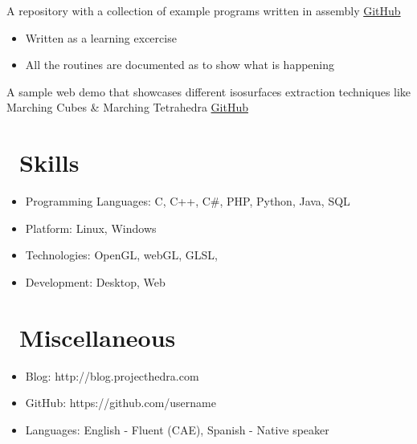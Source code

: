 \documentclass{resume}
\begin{document}
A repository with a collection of example programs written in assembly
\href {https://github.com/maxilevi/asm-examples}{GitHub}
\begin{itemize}
  \item Written as a learning excercise
  \item All the routines are documented as to show what is happening
\end{itemize}

A sample web demo that showcases different isosurfaces extraction techniques like Marching Cubes \& Marching Tetrahedra
\href {https://github.com/maxilevi/isosurface}{GitHub}


\section{\faCogs\ Skills}
\begin{itemize}[parsep=0.5ex]
  \item Programming Languages: C, C++, C\#, PHP, Python, Java, SQL
  \item Platform: Linux, Windows
  \item Technologies: OpenGL, webGL, GLSL,
  \item Development: Desktop, Web
\end{itemize}


\section{\faInfo\ Miscellaneous}
\begin{itemize}[parsep=0.5ex]
  \item Blog: http://blog.projecthedra.com
  \item GitHub: https://github.com/username
  \item Languages: English - Fluent (CAE), Spanish - Native speaker
\end{itemize}
\end{document}
